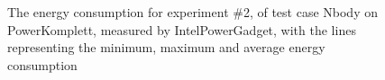 \begin{figure}
                    \caption{The energy consumption for experiment \#2, of test case Nbody on PowerKomplett, measured by IntelPowerGadget, with the lines representing the minimum, maximum and average energy consumption} \label{fig:time_series_Nbody_PowerKomplett_IntelPowerGadget_exp2}
                    \end{figure}
                    